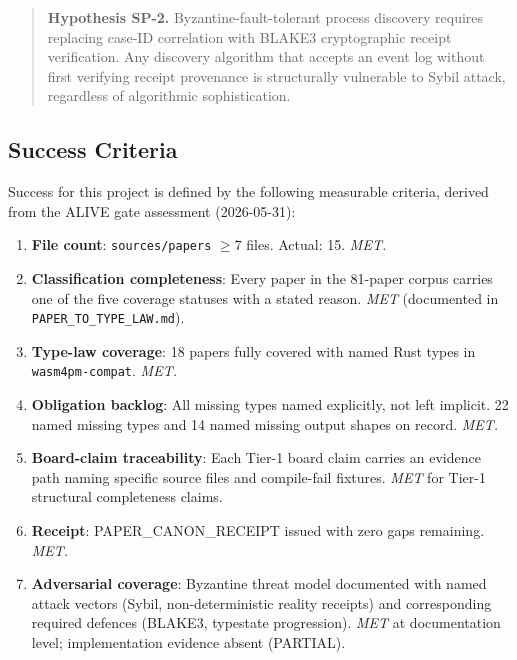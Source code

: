 \begin{quotation}
\noindent\textbf{Hypothesis SP-2.} Byzantine-fault-tolerant process discovery
requires replacing case-ID correlation with BLAKE3 cryptographic receipt
verification. Any discovery algorithm that accepts an event log without first
verifying receipt provenance is structurally vulnerable to Sybil attack,
regardless of algorithmic sophistication.
\end{quotation}

\subsection{Success Criteria}
\label{sec:sources-papers-rq-success}

Success for this project is defined by the following measurable criteria,
derived from the ALIVE gate assessment (2026-05-31):

\begin{enumerate}
  \item \textbf{File count}: \texttt{sources/papers} $\geq 7$ files. Actual:
    15. \emph{MET.}
  \item \textbf{Classification completeness}: Every paper in the 81-paper
    corpus carries one of the five coverage statuses with a stated reason.
    \emph{MET} (documented in \texttt{PAPER\_TO\_TYPE\_LAW.md}).
  \item \textbf{Type-law coverage}: 18 papers fully covered with named Rust
    types in \texttt{wasm4pm-compat}. \emph{MET.}
  \item \textbf{Obligation backlog}: All missing types named explicitly, not
    left implicit. 22 named missing types and 14 named missing output shapes
    on record. \emph{MET.}
  \item \textbf{Board-claim traceability}: Each Tier-1 board claim carries an
    evidence path naming specific source files and compile-fail fixtures.
    \emph{MET} for Tier-1 structural completeness claims.
  \item \textbf{Receipt}: PAPER\_CANON\_RECEIPT issued with zero gaps
    remaining. \emph{MET.}
  \item \textbf{Adversarial coverage}: Byzantine threat model documented with
    named attack vectors (Sybil, non-deterministic reality receipts) and
    corresponding required defences (BLAKE3, typestate progression).
    \emph{MET} at documentation level; implementation evidence absent (PARTIAL).
\end{enumerate}
